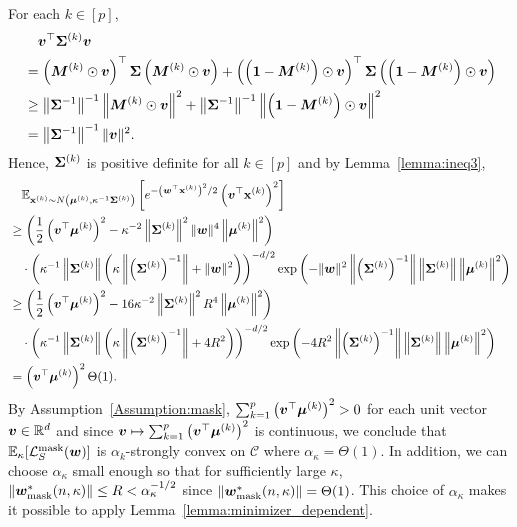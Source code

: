 For each $k \in [p]$,
\begin{align*}
    &\quad {\bm{v}}^\top {\bm{\Sigma}}^{(k)} {\bm{v}}\\
    &= \left({\bm{M}}^{(k)} \odot {\bm{v}}\right)^\top {\bm{\Sigma}} \left({\bm{M}}^{(k)} \odot {\bm{v}}\right) + \left(\left({\bm{1}}-{\bm{M}}^{(k)}\right)\odot {\bm{v}}\right)^\top {\bm{\Sigma}} \left(\left({\bm{1}}-{\bm{M}}^{(k)}\right) \odot {\bm{v}}\right) \\
    &\geq \left\lVert {\bm{\Sigma}} ^{-1} \right\rVert^{-1} \left \lVert {\bm{M}}^{(k)} \odot {\bm{v}}  \right\rVert ^2 + \left\lVert {\bm{\Sigma}} ^{-1} \right\rVert^{-1} \left \lVert \left({\bm{1}}-{\bm{M}}^{(k)} \right) \odot {\bm{v}} \right \rVert ^2\\
    &= \left \lVert {\bm{\Sigma}}^{-1} \right\rVert^{-1} \lVert {\bm{v}} \rVert^2.
\end{align*}
Hence, ${\bm{\Sigma}}^{(k)}$ is positive definite for all $k \in [p]$ and by Lemma~\ref{lemma:ineq3},
\begin{align*}
    &\quad \mathbb{E}_{{\mathbf{x}}^{(k)} \sim N\left ({\bm{\mu}}^{(k)}, \kappa^{-1}{\bm{\Sigma}}^{(k)}\right)}\left[e^{-\left({\bm{w}}^\top {\mathbf{x}}^{(k)}\right)^2/2} \left({\bm{v}}^\top {\mathbf{x}}^{(k)}\right)^2 \right]\\
    &\geq \left(\frac{1}{2} \left({\bm{v}}^\top {\bm{\mu}}^{(k)}\right)^2 - \kappa^{-2} \left \lVert {\bm{\Sigma}}^{(k)} \right \rVert^2 \lVert {\bm{w}} \rVert^4 \left \lVert {\bm{\mu}}^{(k)} \right \rVert^2 \right)\\
    &\quad \cdot \left(\kappa^{-1} \left \lVert {\bm{\Sigma}}^{(k)} \right \rVert\left(\kappa \left\lVert \left({\bm{\Sigma}}^{(k)}\right)^{-1} \right\rVert+ \lVert {\bm{w}} \rVert^2 \right)\right)^{-d/2} \exp \left( -\lVert {\bm{w}} \rVert^2 \left\lVert \left({\bm{\Sigma}}^{(k)}\right)^{-1}\right\rVert \left\lVert {\bm{\Sigma}}^{(k)}\right\rVert \left \lVert {\bm{\mu}}^{(k)} \right \rVert^2 \right)\\
    &\geq \left(\frac{1}{2} \left({\bm{v}}^\top {\bm{\mu}}^{(k)}\right)^2 - 16\kappa^{-2} \left \lVert {\bm{\Sigma}}^{(k)} \right \rVert^2 R^4 \left \lVert {\bm{\mu}}^{(k)} \right \rVert^2 \right)\\
    &\quad \cdot \left(\kappa^{-1} \left \lVert {\bm{\Sigma}}^{(k)} \right \rVert\left(\kappa \left\lVert \left({\bm{\Sigma}}^{(k)}\right)^{-1} \right\rVert+ 4R^2 \right)\right)^{-d/2} \exp \left( -4R^2 \left\lVert \left({\bm{\Sigma}}^{(k)}\right)^{-1}\right\rVert \left\lVert {\bm{\Sigma}}^{(k)}\right\rVert \left \lVert {\bm{\mu}}^{(k)} \right \rVert^2 \right)\\
    &= \left({\bm{v}}^\top {\bm{\mu}}^{(k)}\right)^2 \Theta(1).
\end{align*}
By Assumption~\ref{Assumption:mask}, $\sum_{k=1}^p \left({\bm{v}}^\top {\bm{\mu}}^{(k)}\right)^2 >0$ for each unit vector ${\bm{v}} \in \mathbb{R}^d$ and since ${\bm{v}} \mapsto \sum_{k=1}^p \left({\bm{v}}^\top {\bm{\mu}}^{(k)}\right)^2$ is continuous, we conclude that $\mathbb{E}_\kappa [\mathcal{L}_S^\mathrm{mask} ({\bm{w}})]$ is $\alpha_k$-strongly convex on $\mathcal{C}$ where $\alpha_\kappa = \Theta(1)$. In addition, we can choose $\alpha_\kappa$ small enough so that for sufficiently large $\kappa$, $\lVert {\bm{w}}^*_\mathrm{mask}(n,\kappa) \rVert \leq R < \alpha_\kappa^{-1/2}$ since $\lVert {\bm{w}}^*_\mathrm{mask}(n,\kappa) \rVert = \Theta(1)$. This choice of $\alpha_\kappa$ makes it possible to apply Lemma~\ref{lemma:minimizer_dependent}.

